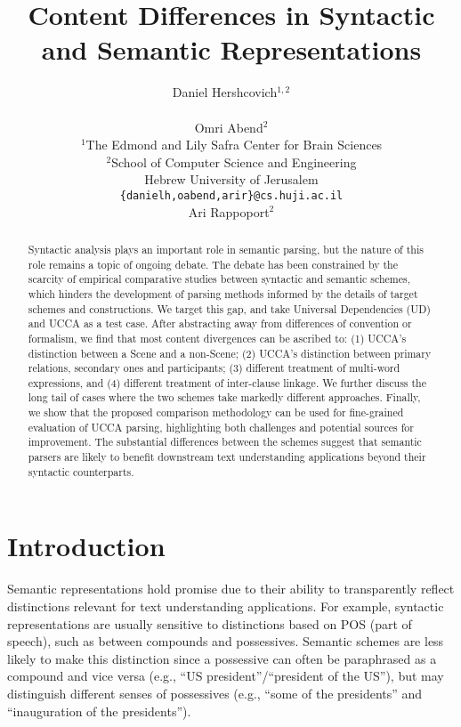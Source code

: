 \documentclass[11pt,a4paper,table]{article}
\title{Content Differences in Syntactic and Semantic Representations}
\author{Daniel Hershcovich$^{1,2}$ \\
  \\\And
  Omri Abend$^2$ \\
  $^1$The Edmond and Lily Safra Center for Brain Sciences \\
  $^2$School of Computer Science and Engineering \\
  Hebrew University of Jerusalem \\
  \texttt{\{danielh,oabend,arir\}@cs.huji.ac.il}
  \\\And
  Ari Rappoport$^2$
}
\date{}
\begin{document}
\maketitle

\begin{abstract}
  Syntactic analysis plays an important role in semantic parsing,
  but the nature of this role remains a topic of ongoing debate.
  The debate has been constrained by the scarcity of empirical comparative studies between syntactic and semantic schemes,
  which hinders the development of parsing methods informed by the details of target schemes and constructions.
  We target this gap, and take Universal Dependencies (UD) and UCCA as a test case.
  After abstracting away from differences of convention or formalism,
  we find that most content divergences can be ascribed to: 
  (1) UCCA's distinction between a Scene and a non-Scene;
  (2) UCCA's distinction between primary relations, secondary ones and participants;
  (3) different treatment of multi-word expressions, and
  (4) different treatment of inter-clause linkage.
  We further discuss the long tail of cases where the two schemes take markedly
  different approaches.
  Finally, we show that the proposed comparison methodology can be used
  for fine-grained evaluation of UCCA parsing,
  highlighting both challenges and potential sources for improvement.
  The substantial differences between the schemes suggest that
  semantic parsers are likely to benefit downstream text understanding applications
  beyond their syntactic counterparts.
\end{abstract}


\section{Introduction}\label{sec:introduction}
  
  Semantic representations hold promise due to
  their ability to transparently reflect distinctions relevant for text understanding
  applications. For example, syntactic representations
  are usually sensitive to distinctions based on POS (part of speech), such as between compounds
  and possessives. Semantic schemes are  less likely to make
  this distinction since a possessive can often be paraphrased as a compound
  and vice versa (e.g., ``US president''/``president of the US''),
  but may distinguish different senses of possessives (e.g., ``some of the presidents'' and ``inauguration of the presidents'').
\end{document}
